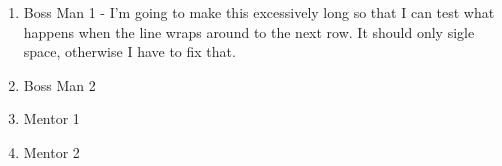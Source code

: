 \begin{enumerate}
\item Boss Man 1 - I'm going to make this excessively long so that I can test what happens when the line wraps around to the next row. It should only sigle space, otherwise  I have to fix that.
\item Boss Man 2
\item Mentor 1
\item Mentor 2
\end{enumerate}